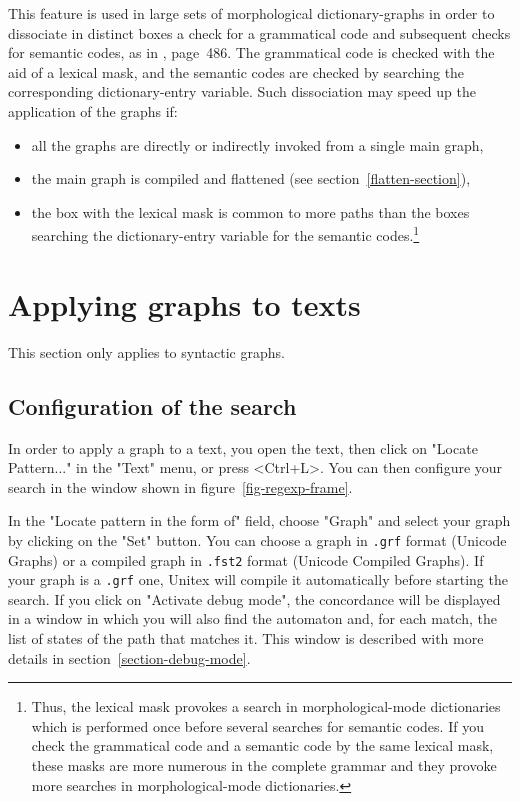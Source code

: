 \bigskip
\noindent This feature is used in large sets of morphological dictionary-graphs in order to dissociate in distinct boxes
a check for a grammatical code and subsequent checks for semantic codes, as in \cite{paumier_nam_2014}, page~486.
The grammatical code is checked with the aid of a lexical mask, and the semantic codes are checked by searching the corresponding
dictionary-entry variable. 
Such dissociation may speed up the application of the graphs if:
\begin{itemize}
\item all the graphs are directly or indirectly invoked from a single main graph,
\item the main graph is compiled and flattened (see section~\ref{flatten-section}),
\item the box with the lexical mask is common to more paths than the boxes searching the dictionary-entry variable
for the semantic codes.\footnote{Thus, the lexical mask provokes a search in morphological-mode dictionaries
which is performed once before several searches for semantic codes.
If you check the grammatical code and a semantic code by the same lexical mask, these masks are more numerous
in the complete grammar and they provoke more searches in morphological-mode dictionaries.}
\end{itemize}

\section{Applying graphs to texts}
\label{section-applying-graphs-to-text}
This section only applies to syntactic graphs.
\subsection{Configuration of the search}
In order to apply a graph to a text, you open the text, then click on "Locate
Pattern..." in the "Text" menu, or press <Ctrl+L>. You can then configure your
search in the window shown in figure~\ref{fig-regexp-frame}.

\bigskip
{}
\noindent In the "Locate pattern in the form of" field, choose "Graph" and
select your graph by clicking on the "Set" button. You can choose a graph in \verb+.grf+
format (Unicode Graphs) or a compiled graph in \verb+.fst2+ format (Unicode
Compiled Graphs). If your graph is a \verb+.grf+ one, Unitex will compile it
automatically before starting the search. If you click on "Activate debug mode", the 
concordance will be displayed in a window in which you will also find the automaton and, 
for each match, the list of states of the path that matches it. This window is described
with more details in section~\ref{section-debug-mode}.

